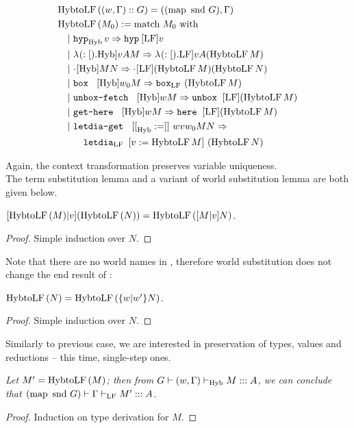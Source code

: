 \begin{align*}
&\funHybtoLF{(w, \Gamma) :: G} = ((\map{\snd{}}{G}), \Gamma) \\
&\funHybtoLF{M_0} := \match{M_0} \\
&~~~|~ \hyp[\tHyb] v => \hyp [\tLF] v\\
&~~~|~ \lam [\tHyb] v A M => \lam [\tLF] v A (\funHybtoLFe{M}) \\
&~~~|~ \appl [\tHyb] M N => \appl [\tLF] {(\funHybtoLFe{M})} {(\funHybtoLFe{N})}\\
&~~~|~ \bbox [\tHyb] {w_0} {M} => \bboxe_{\tLF} \ (\funHybtoLFe M) \\
&~~~|~ \unboxfetch [\tHyb] w M => \unbox [\tLF] (\funHybtoLFe M) \\
&~~~|~ \gethere [\tHyb] w M => \here [\tLF] (\funHybtoLFe M) \\
&~~~|~ \letdiaget [\tHyb] w v {w_0} M N => \\
&~~~~~~~~\letdia [\tLF] {v} {} {\funHybtoLFe M} {(\funHybtoLFe N)}
\end{align*}

Again, the context transformation preserves variable uniqueness.\\

The term substitution lemma and a variant of world substitution lemma are both given below.

\begin{lemma}
$\mbox{$ [\mbox{$\operatorname{HybtoLF} {(M)}$} | v] (\mbox{$\operatorname{HybtoLF} {(N)}$})$} = \mbox{$\operatorname{HybtoLF} {(\mbox{$ [M | v] N$})}$}$.
\begin{proof}
Simple induction over $N$.
\end{proof}
\end{lemma}

Note that there are no world names in \langLF{}, therefore world substitution does not change the end result of \funHybtoLFe{}:
\begin{lemma}
$\mbox{$\operatorname{HybtoLF} {(N)}$} = \mbox{$\operatorname{HybtoLF} {(\mbox{$ \{w | w' \} N$})}$}$.
\begin{proof}
Simple induction over $N$.
\end{proof}
\end{lemma}

Similarly to previous case, we are interested in preservation of types, values and reductions -- this time, single-step ones.

\begin{theorem} \em
Let $M' = \mbox{$\operatorname{HybtoLF} {(M)}$}$; then from $G |- (w, \Gamma) |-_{\text{Hyb}} M ::: A$, we can conclude that $(\mbox{$\operatorname{map}\ {\mbox{$\text{snd}$}{}} \ {G}$}) |- \Gamma |-_{\text{LF}} M' ::: A$.
\begin{proof}
Induction on type derivation for $M$. 
\end{proof}
\end{theorem}

